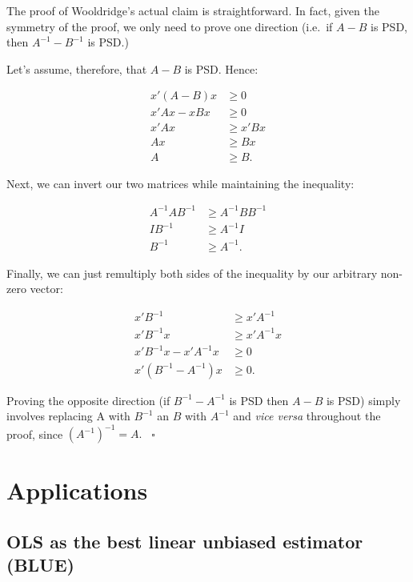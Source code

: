 \documentclass[
]{book}
\begin{document}
The proof of Wooldridge's actual claim is straightforward. In fact, given the symmetry of the proof, we only need to prove one direction (i.e.~if \(A-B\) is PSD, then \(A^{-1} - B^{-1}\) is PSD.)

Let's assume, therefore, that \(A - B\) is PSD. Hence:

\[
\begin{aligned}
x'(A-B)x &\geq 0 \\
x'Ax - xBx &\geq 0 \\
x'Ax &\geq x'Bx \\
Ax &\geq Bx \\
A &\geq B.
\end{aligned}
\]

Next, we can invert our two matrices while maintaining the inequality:

\[
\begin{aligned}
A^{-1}AB^{-1} &\geq A^{-1}BB^{-1} \\
IB^{-1} &\geq A^{-1}I \\
B^{-1} &\geq A^{-1}.
\end{aligned}
\]

Finally, we can just remultiply both sides of the inequality by our arbitrary non-zero vector:

\[
\begin{aligned}
x'B^{-1} &\geq x'A^{-1} \\
x'B^{-1}x &\geq x'A^{-1}x \\
x'B^{-1}x - x'A^{-1}x &\geq 0 \\
x'(B^{-1} - A^{-1})x &\geq 0.
\end{aligned}
\]

Proving the opposite direction (if \(B^{-1} - A^{-1}\) is PSD then \(A-B\) is PSD) simply involves replacing A with \(B^{-1}\) an \(B\) with \(A^{-1}\) and \emph{vice versa} throughout the proof, since \((A^{-1})^{-1} = A. \;\;\;\square\)

\hypertarget{pd_app}{%
\section{Applications}\label{pd_app}}

\hypertarget{ols-as-the-best-linear-unbiased-estimator-blue}{%
\subsection{OLS as the best linear unbiased estimator (BLUE)}\label{ols-as-the-best-linear-unbiased-estimator-blue}}
\end{document}
